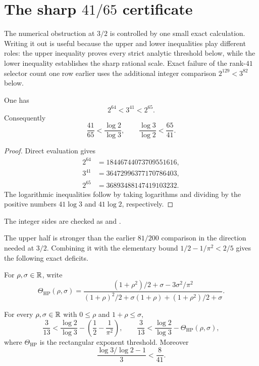 \documentclass[11pt]{article}
\begin{document}
\section{The sharp $41/65$ certificate}\label{sec:sharp}

The numerical obstruction at $3/2$ is controlled by one small exact
calculation.  Writing it out is useful because the upper and lower inequalities
play different roles: the upper inequality proves every strict analytic
threshold below, while the lower inequality establishes the sharp rational
scale.  Exact failure of the rank-$41$ selector count one row earlier uses the
additional integer comparison $2^{129}<3^{82}$ below.

\begin{theorem}\label{res:powerbracket}
One has
\[
 2^{64}<3^{41}<2^{65}.
\]
Consequently
\[
 \frac{41}{65}<\frac{\log2}{\log3},
 \qquad
 \frac{\log3}{\log2}<\frac{65}{41}.
\]
\end{theorem}

\begin{proof}
Direct evaluation gives
\[
 \begin{aligned}
 2^{64}&=18446744073709551616,\\
 3^{41}&=36472996377170786403,\\
 2^{65}&=36893488147419103232.
 \end{aligned}
\]
The logarithmic inequalities follow by taking logarithms and dividing by the
positive numbers $41\log3$ and $41\log2$, respectively.
\end{proof}

\noindent The integer sides are checked as
and
.

The upper half is stronger than the earlier $81/200$ comparison in the
direction needed at $3/2$.  Combining it with the elementary bound
$1/2-1/\pi^2<2/5$ gives the following exact deficits.

For $\rho,\sigma\in\mathbb{R}$, write
\[
 \Theta_{\mathrm{HP}}(\rho,\sigma)=
 \frac{(1+\rho^2)/2+\sigma-3\sigma^2/\pi^2}
 {(1+\rho)^2/2+\sigma(1+\rho)+(1+\rho^2)/2+\sigma}.
\]

\begin{corollary}\label{res:sharpgaps}
For every $\rho,\sigma\in\mathbb{R}$ with $0\le\rho$ and $1+\rho\le\sigma$,
\[
 \frac3{13}<\frac{\log2}{\log3}
   -\left(\frac12-\frac1{\pi^2}\right),
 \qquad
 \frac3{13}<\frac{\log2}{\log3}-\Theta_{\mathrm{HP}}(\rho,\sigma),
\]
where $\Theta_{\mathrm{HP}}$ is the rectangular exponent threshold.  Moreover
\[
 \frac{\log3/\log2-1}{3}<\frac8{41}.
\]
\end{corollary}
\end{document}
